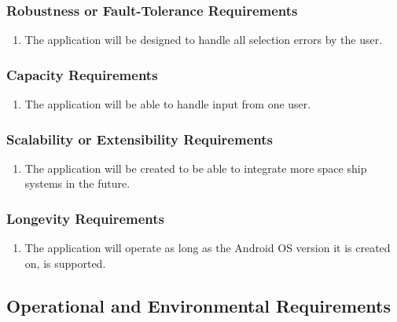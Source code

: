\documentclass[12pt, titlepage]{article}
\begin{document}
\subsubsection{Robustness or Fault-Tolerance Requirements}
\label{ssub:robustness_or_fault_tolerance_requirements}
\begin{enumerate}[{PR}3. ]
	\item The application will be designed to handle all selection errors by the user.
\end{enumerate}

\subsubsection{Capacity Requirements}
\label{ssub:capacity_requirements}
\begin{enumerate}[{PR}4. ]
	\item The application will be able to handle input from one user.
\end{enumerate}

\subsubsection{Scalability or Extensibility Requirements}
\label{ssub:scalability_or_extensibility_requirements}
\begin{enumerate}[{PR}5. ]
	\item The application will be created to be able to integrate more space ship systems in the future.
\end{enumerate}

\subsubsection{Longevity Requirements}
\label{ssub:longevity_requirements}
\begin{enumerate}[{PR}6. ]
	\item The application will operate as long as the Android OS version it is created on, is supported.
\end{enumerate}


\subsection{Operational and Environmental Requirements}
\label{sub:operational_and_environmental_requirements}
\end{document}

